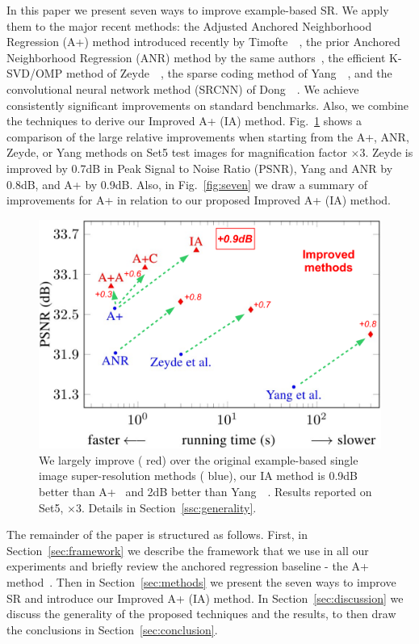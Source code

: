 \documentclass[10pt,twocolumn,letterpaper]{article}
\begin{document}
In this paper we present seven ways to improve example-based SR.
We apply them to the major recent methods: the Adjusted Anchored Neighborhood Regression (A+) method introduced recently by Timofte~\etal~\cite{Timofte-ACCV-2014}, the prior Anchored Neighborhood Regression (ANR) method by the same authors~\cite{Timofte-ICCV-2013}, the efficient K-SVD/OMP method of Zeyde~\etal~\cite{Zeyde-CS-2012}, the sparse coding method of Yang~\etal~\cite{Yang-CVPR-2008}, and the convolutional neural network method (SRCNN) of Dong~\etal~\cite{Dong-ECCV-2014}. We achieve consistently significant improvements on standard benchmarks. 
Also, we combine the techniques to derive our Improved A+ (IA) method.
Fig.~\ref{fig:teaser} shows a comparison of the large relative improvements when starting from the A+, ANR, Zeyde, or Yang methods on Set5 test images for magnification factor $\times3$. Zeyde is improved by 0.7dB in Peak Signal to Noise Ratio (PSNR), Yang and ANR by 0.8dB, and A+ by 0.9dB. Also, in Fig.~\ref{fig:seven} we draw a summary of improvements for A+ in relation to our proposed Improved A+ (IA) method.
\begin{figure}[t!]
\includegraphics[width=\columnwidth]{TeaserFinal}
\caption{We largely improve ({\color{red} red}) over the original example-based single image super-resolution methods ({\color{blue} blue}), \ie our IA method is 0.9dB better than A+~\cite{Timofte-ACCV-2014} and 2dB better than Yang~\etal~\cite{Yang-CVPR-2008}. Results reported on Set5, $\times3$. Details in Section~\ref{ssc:generality}.} 
\label{fig:teaser}
\vspace{-0.5cm}
\end{figure}

The remainder of the paper is structured as follows.
First, in Section~\ref{sec:framework} we describe the framework that we use in all our experiments and briefly review the anchored regression baseline - the A+ method~\cite{Timofte-ACCV-2014}. Then in Section~\ref{sec:methods} we present the seven ways to improve SR and introduce our Improved A+ (IA) method. In Section~\ref{sec:discussion} we discuss the generality of the proposed techniques and the results, to then draw the conclusions in Section~\ref{sec:conclusion}.
\end{document}
